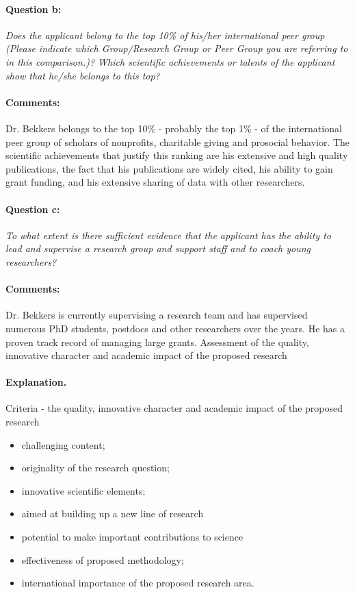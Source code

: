 \documentclass[twocolumn, serif, rga, numeric]{jote-article}
\begin{document}
\paragraph{Question b:}
\textit{Does the applicant belong to the top 10\% of his/her international peer group (Please indicate which Group/Research Group or Peer Group you are referring to in this comparison.)? Which scientific achievements or talents of the applicant show that he/she belongs to this top?}
\paragraph{Comments:}
Dr. Bekkers belongs to the top 10\% - probably the top 1\% - of the international peer group of scholars of nonprofits, charitable giving and prosocial behavior. The scientific achievements that justify this ranking are his extensive and high quality publications, the fact that his publications are widely cited, his ability to gain grant funding, and his extensive sharing of data with other researchers.
\paragraph{Question c:}
\textit{To what extent is there sufficient evidence that the applicant has the ability to lead and supervise a research group and support staff and to coach young researchers?}
\paragraph{Comments:}
Dr. Bekkers is currently supervising a research team and has supervised numerous PhD students, postdocs and other researchers over the years. He has a proven track record of managing large grants.
Assessment of the quality, innovative character and academic impact of the proposed research
\paragraph{Explanation.}
Criteria - the quality, innovative character and academic impact of the proposed research 
\begin{itemize} 
\item challenging content; \item originality of the research question; \item innovative scientific elements; \item aimed at building up a new line of research\item potential to make important contributions to science\item effectiveness of proposed methodology; \item international importance of the proposed research area.
\end{itemize}
\end{document}
